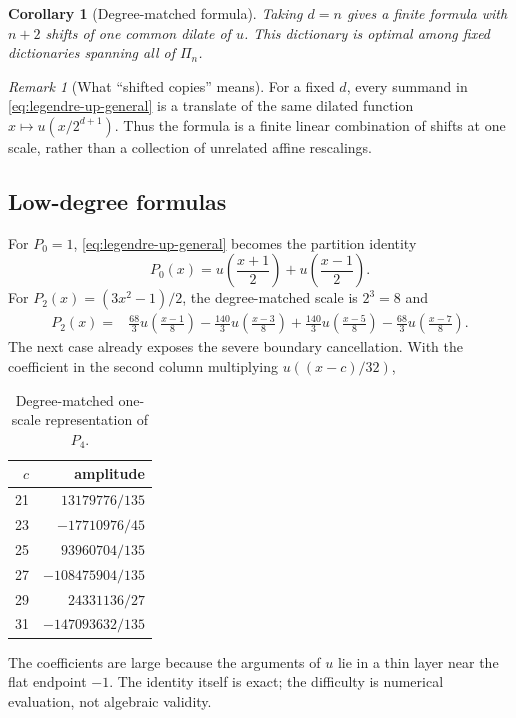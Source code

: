 \documentclass[11pt,oneside]{article}
\newtheorem{corollary}[theorem]{Corollary}
\theoremstyle{definition}
\theoremstyle{remark}
\newtheorem{remark}[theorem]{Remark}
\begin{document}
\begin{corollary}[Degree-matched formula]
\label{cor:degree-matched}
Taking $d=n$ gives a finite formula with $n+2$ shifts of one common dilate of
$u$.  This dictionary is optimal among fixed dictionaries spanning all of
$\Pi_n$.
\end{corollary}

\begin{remark}[What ``shifted copies'' means]
For a fixed $d$, every summand in \eqref{eq:legendre-up-general} is a translate
of the same dilated function $x\mapsto u(x/2^{d+1})$.  Thus the formula is a
finite linear combination of shifts at one scale, rather than a collection of
unrelated affine rescalings.
\end{remark}

\subsection{Low-degree formulas}
For $P_0=1$, \eqref{eq:legendre-up-general} becomes the partition identity
\begin{equation}
 P_0(x)=u\!\left(\frac{x+1}{2}\right)
       +u\!\left(\frac{x-1}{2}\right).
 \label{eq:P0-up}
\end{equation}
For $P_2(x)=(3x^2-1)/2$, the degree-matched scale is $2^{3}=8$ and
\begin{align}
 P_2(x)={}&\frac{68}{3}u\!\left(\frac{x-1}{8}\right)
 -\frac{140}{3}u\!\left(\frac{x-3}{8}\right)
 +\frac{140}{3}u\!\left(\frac{x-5}{8}\right)
 -\frac{68}{3}u\!\left(\frac{x-7}{8}\right).
 \label{eq:P2-up}
\end{align}
The next case already exposes the severe boundary cancellation.  With the
coefficient in the second column multiplying $u((x-c)/32)$,
\begin{table}[htbp]
\centering
\caption{Degree-matched one-scale representation of $P_4$.}
\label{tab:P4-up}
\begin{tabular}{@{}rr@{}}
\toprule
$c$ & amplitude\\
\midrule
21 & $13179776/135$\\
23 & $-17710976/45$\\
25 & $93960704/135$\\
27 & $-108475904/135$\\
29 & $24331136/27$\\
31 & $-147093632/135$\\
\bottomrule
\end{tabular}
\end{table}
The coefficients are large because the arguments of $u$ lie in a thin layer
near the flat endpoint $-1$.  The identity itself is exact; the difficulty is
numerical evaluation, not algebraic validity.
\end{document}
